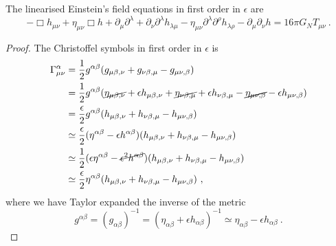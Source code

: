     The linearised Einstein's field equations in first order in $\epsilon$ are 
    \begin{equation*}
        - \Box h_{\mu\nu} + \eta_{\mu\nu} \Box h + \partial_\mu \partial^\lambda + \partial_\nu \partial^\lambda h_{\lambda \mu} - \eta_{\mu\nu} \partial^\lambda \partial^\rho h_{\lambda \rho} - \partial_\mu \partial_\nu h = 16 \pi G_N T_{\mu\nu} ~.
    \end{equation*}
    \begin{proof}
        The Christoffel symbols in first order in $\epsilon$ is 
        \begin{equation*}
        \begin{aligned}
            \Gamma^\alpha_{\mu\nu} & = \frac{1}{2} g^{\alpha\beta} (g_{\mu\beta, \nu} + g_{\nu\beta,\mu} - g_{\mu\nu,\beta}) \\ & = \frac{1}{2} g^{\alpha\beta} (\cancel{\eta_{\mu\beta, \nu}} + \epsilon h_{\mu\beta, \nu} + \cancel{\eta_{\nu\beta,\mu}} + \epsilon h_{\nu\beta,\mu} - \cancel{\eta_{\mu\nu,\beta} }- \epsilon h_{\mu\nu,\beta} ) \\ & = \frac{\epsilon}{2} g^{\alpha\beta} (h_{\mu\beta, \nu} + h_{\nu\beta,\mu} - h_{\mu\nu,\beta}) \\ & \simeq \frac{\epsilon}{2} (\eta^{\alpha\beta} - \epsilon h^{\alpha\beta}) (h_{\mu\beta, \nu} + h_{\nu\beta,\mu} - h_{\mu\nu,\beta}) \\ & \simeq \frac{1}{2} (\epsilon \eta^{\alpha\beta} - \cancel{\epsilon^2 h^{\alpha\beta}}) (h_{\mu\beta, \nu} + h_{\nu\beta,\mu} - h_{\mu\nu,\beta}) \\ & \simeq \frac{\epsilon}{2} \eta^{\alpha\beta} (h_{\mu\beta, \nu} + h_{\nu\beta,\mu} - h_{\mu\nu,\beta}) ~,
        \end{aligned}
        \end{equation*}
        where we have Taylor expanded the inverse of the metric 
        \begin{equation*}
            g^{\alpha\beta} = (g_{\alpha\beta})^{-1} = (\eta_{\alpha\beta} + \epsilon h_{\alpha\beta})^{-1} \simeq \eta_{\alpha\beta} - \epsilon h_{\alpha\beta}  ~.
        \end{equation*}


\end{proof}
